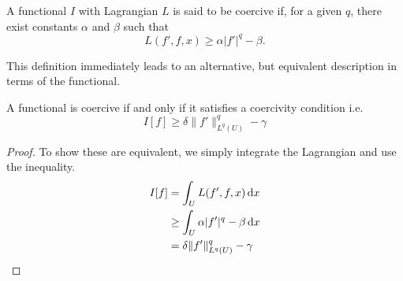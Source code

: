 \begin{definition}\label{def:coercive}
    A functional \(I\) with Lagrangian \(L\) is said to be coercive if, for a
    given \(q\), there exist constants \(\alpha\) and \(\beta\) such that
    \begin{equation}
        L(f', f, x) \geq \alpha |f'|^q - \beta.
    \end{equation}
\end{definition}
This definition immediately leads to an alternative, but equivalent description
in terms of the functional.
\begin{lemma}
    A functional is coercive if and only if it satisfies a coercivity condition
    i.e.
    \begin{equation}
        I[f] \geq \delta \|f'\|^q_{L^q(U)} - \gamma
    \end{equation}
\end{lemma}
\begin{proof}
    To show these are equivalent, we simply integrate the Lagrangian and use the
    inequality.
    \begin{align*}
        I[f] & = \int_U L(f',f,x)\dd{x}                    \\
             & \geq \int_U \alpha |f'|^q - \beta \dd{x}    \\
             & = \delta\|f'\|_{L^q(U)}^q - \gamma \qedhere
    \end{align*}
\end{proof}
